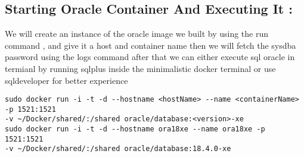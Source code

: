 \documentclass{article}
\begin{document}
\vspace{0.25cm}
\subsection{Starting Oracle Container And Executing It :}
We will create an instance of the oracle image we built by using the run command , and give it a host and container name
then we will fetch the sysdba password using the logs command after that we can either execute sql oracle in termianl
by running sqlplus inside the minimalistic docker terminal or use sqldeveloper for better experience 

\vspace{0.25cm}
\begin{tcolorbox}[title = Container Instance Creation]

\begin{verbatim}
sudo docker run -i -t -d --hostname <hostName> --name <containerName> -p 1521:1521
-v ~/Docker/shared/:/shared oracle/database:<version>-xe
sudo docker run -i -t -d --hostname ora18xe --name ora18xe -p 1521:1521
-v ~/Docker/shared/:/shared oracle/database:18.4.0-xe
\end{verbatim}

\end{tcolorbox}
\end{document}
